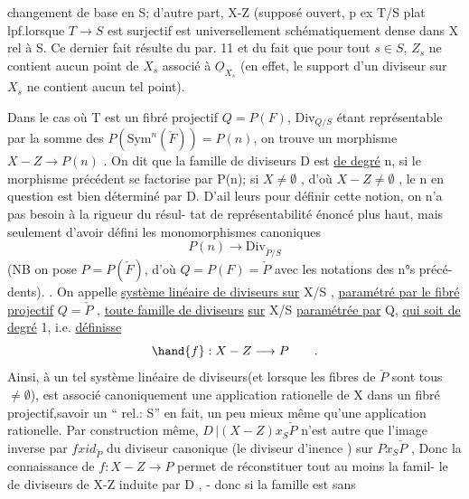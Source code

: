 changement de base en S; d'autre part, X-Z (supposé ouvert, p ex T/S plat lpf.lorsque $T \to S$ est surjectif\unsure{)} est universellement
schématiquement dense dans X rel à S. Ce dernier fait résulte du 
 par. 11 et du fait que pour tout $s \in S$,
$Z_s$ ne contient aucun point de $X_s$ associé à $\underline{O}_{X_s}$ (en effet, le support d'un
diviseur  sur $X_s$ ne contient aucun tel point).

Dans le cas où T est un fibré projectif $Q=P(F)$, $\mathrm{Div}_{Q/S}$
étant représentable par la somme des $P(\mathrm{Sym}^n(\check{F})) = P(n)$, on trouve
un morphisme $X-Z \longrightarrow P(n)$ . On dit que la famille de diviseurs
D est \uline{de degré} n, si le morphisme précédent se factorise par P(n); si
$X \neq \emptyset$ , d'où $X-Z \neq \emptyset$ , le n en question est bien déterminé par D. D'ail%
leurs pour définir cette notion, on n'a pas besoin à la rigueur du résul-%
tat de représentabilité énoncé plus haut, mais seulement d'avoir défini
les monomorphismes canoniques
\[ P(n) \longrightarrow \mathrm{Div}_{\check{P}/S} \]
(NB on pose $P = P(\check{F})$, d'où $Q = P(F) = \check{P}$ avec les notations des n°s précé-%
dents). . On appelle \uline{système linéaire de diviseurs sur} X/S , \uline{paramétré
par le fibré projectif} $Q = \check{P}$ , \uline{toute famille de diviseurs} \uline{sur} X/S
\uline{paramétrée par} Q, \uline{qui soit de degré} 1, i.e. \uline{définisse}
\[ \hand{f} : X-Z \longrightarrow P \qquad . \]
Ainsi, à un tel système  linéaire de diviseurs(et lorsque les fibres de $\check{P}$ sont tous $\neq \emptyset$), est associé canoniquement
une application rationelle de X dans un fibré projectif,savoir un ``  rel.: S'' \hand{(}en fait, un peu
mieux même qu'une application rationelle\hand{)}. Par construction même,
$D\,|(X-Z)x_S\check{P}$ n'est autre que l'image inverse par $f x id_{\check{P}}$ du diviseur
canonique (le diviseur d'inence ) sur $Px_S\check{P}$ , Donc la connaissance
de $f: X-Z \longrightarrow P$ permet de réconstituer  tout au moins la famil-%
le de diviseurs de X-Z induite par D , - donc si la famille est sans
